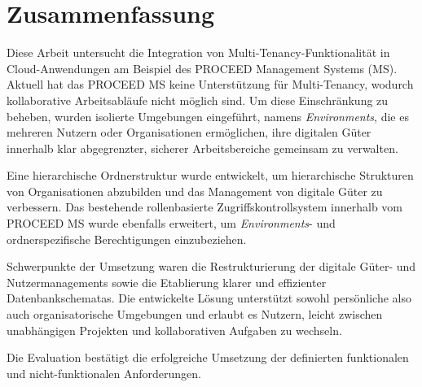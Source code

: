 \chapter*{Zusammenfassung}
\label{cha:zusammenfassung}

Diese Arbeit untersucht die Integration von Multi-Tenancy-Funktionalität in Cloud-Anwendungen am Beispiel des PROCEED Management Systems (MS).
Aktuell hat das PROCEED MS keine Unterstützung für Multi-Tenancy,
wodurch kollaborative Arbeitsabläufe nicht möglich sind.
Um diese Einschränkung zu beheben, wurden isolierte Umgebungen eingeführt,
namens \textit{Environments},
die es mehreren Nutzern oder Organisationen ermöglichen, ihre digitalen Güter innerhalb klar abgegrenzter,
sicherer Arbeitsbereiche gemeinsam zu verwalten.

Eine hierarchische Ordnerstruktur wurde entwickelt, um hierarchische Strukturen von
Organisationen abzubilden und das Management von digitale Güter zu verbessern.
Das bestehende rollenbasierte Zugriffskontrollsystem innerhalb vom PROCEED MS wurde ebenfalls erweitert, 
um \textit{Environments}- und ordnerspezifische Berechtigungen einzubeziehen.

Schwerpunkte der Umsetzung waren die Restrukturierung der digitale Güter- und Nutzermanagements sowie
die Etablierung klarer und effizienter Datenbankschematas.
Die entwickelte Lösung unterstützt sowohl persönliche also auch organisatorische Umgebungen und erlaubt es Nutzern,
leicht zwischen unabhängigen Projekten und kollaborativen Aufgaben zu wechseln.

Die Evaluation bestätigt die erfolgreiche Umsetzung der definierten funktionalen und nicht-funktionalen Anforderungen.
